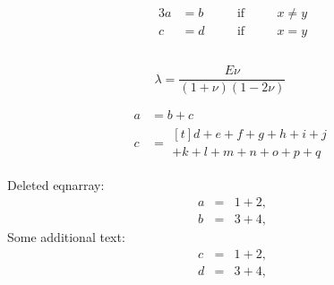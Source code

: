 \documentclass{article}
\begin{document}
\begin{alignat*}{3}
  a& = b &\quad & \text{if} & \quad & x\ne y\\
  c& = d &      & \text{if} &       & x = y
\end{alignat*}    


\begin{equation}\label{eq:elas:C}
\end{equation}

\begin{equation}\label{eq:elas:lam-mu}
  \lambda = \frac{E \nu}{ (1+\nu)(1-2\nu)} \qquad
\end{equation}


\begin{align}
  a & = b + c \\
  c & =
      \begin{multlined}[t]
        d + e + f + g + h + i + j \\
        + k + l + m + n + o + p + q
      \end{multlined}
\end{align}


Deleted eqnarray:
\begin{eqnarray}
a &=& 1 + 2, \label{eq:a}\\
b &=& 3 + 4, \label{eq:b}
\end{eqnarray}
Some additional text:
\begin{eqnarray}
c &=& 1 + 2, \label{eq:c}\\
d &=& 3 + 4, \label{eq:d}
\end{eqnarray}
\end{document}
